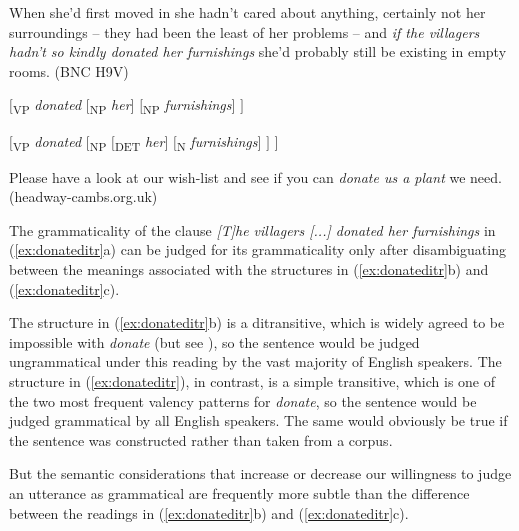 \begin{exe}
\ex
\begin{xlist} 
\label{ex:donateditr}

\ex When she'd first moved in she hadn't cared about anything, certainly not her surroundings -- they had been the least of her problems -- and \textit{if the villagers hadn't so kindly donated her furnishings} she'd probably still be existing in empty rooms. (BNC H9V)

\ex $[$\textsubscript{VP} \textit{donated }$[$\textsubscript{NP} \textit{her}$]$ $[$\textsubscript{NP} \textit{furnishings}$]$ $]$

\ex $[$\textsubscript{VP} \textit{donated }$[$\textsubscript{NP} $[$\textsubscript{DET }\textit{her}$]$ $[$\textsubscript{N} \textit{furnishings}$]$ $]$ $]$

\ex Please have a look at our wish-list and see if you can \textit{donate us a plant} we need. (headway-cambs.org.uk)

\end{xlist}
\end{exe}

The grammaticality of the clause \textit{[T]he villagers [...] donated her furnishings} in (\ref{ex:donateditr}a) can be judged for its grammaticality only after disambiguating between the meanings associated with the structures in (\ref{ex:donateditr}b) and (\ref{ex:donateditr}c).

The structure in (\ref{ex:donateditr}b) is a ditransitive, which is widely agreed to be impossible with \textit{donate} (but see \citet{stefanowitsch_linguistics_2007}), so the sentence would be judged ungrammatical under this reading by the vast majority of English speakers. The structure in (\ref{ex:donateditr}), in contrast, is a simple transitive, which is one of the two most frequent valency patterns for \textit{donate}, so the sentence would be judged grammatical by all English speakers. The same would obviously be true if the sentence was constructed rather than taken from a corpus.

But the semantic considerations that increase or decrease our willingness to judge an utterance as grammatical are frequently more subtle than the difference between the readings in (\ref{ex:donateditr}b) and (\ref{ex:donateditr}c).

